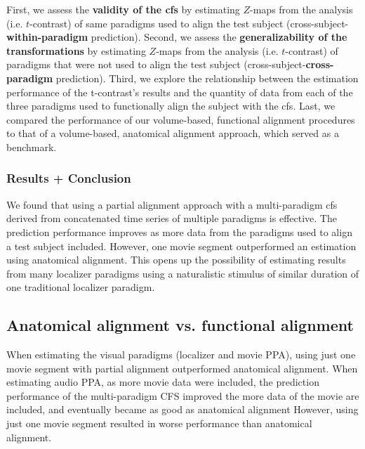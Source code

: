 %
First, we assess the \textbf{validity of the \ac{cfs}} by estimating $Z$-maps
from the analysis (i.e. $t$-contrast) of same paradigms used to align the test
subject (cross-subject-\textbf{within-paradigm} prediction).
%
Second, we assess the \textbf{generalizability of the transformations}
by estimating $Z$-maps from the analysis (i.e. $t$-contrast) of paradigms that
were not used to align the test subject (cross-subject-\textbf{cross-paradigm}
prediction).
%
Third, we explore the relationship between the estimation performance of the
t-contrast's results and the quantity of data from each of the three paradigms
used to functionally align the subject with the \ac{cfs}.
%
Last, we compared the performance of our volume-based, functional alignment
procedures to that of a volume-based, anatomical alignment approach, which
served as a benchmark.


\subsubsection{Results + Conclusion}
%
We found that using a partial alignment approach with a multi-paradigm \ac{cfs}
derived from concatenated time series of multiple paradigms is effective.
%
The prediction performance improves as more data from the paradigms used to
align a test subject included.
%
However, one movie segment outperformed an estimation using anatomical
alignment.
%
This opens up the possibility of estimating results from many localizer
paradigms using a naturalistic stimulus of similar duration of one traditional
localizer paradigm.



\subsection{Anatomical alignment vs. functional alignment}



%
When estimating the visual paradigms (localizer and movie PPA), using just one
movie segment with partial alignment outperformed anatomical alignment.
%
When estimating audio PPA, as more movie data were included, the prediction
performance of the multi-paradigm CFS improved the more data of the movie are
included, and eventually became as good as anatomical alignment
%
However, using just one movie segment resulted in worse performance than
anatomical alignment.

